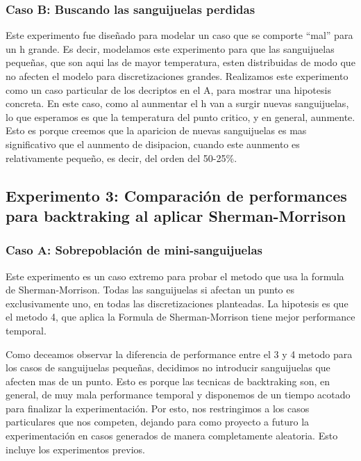 \subsubsection{Caso B: Buscando las sanguijuelas perdidas}

Este experimento fue dise\~nado para modelar un caso que se comporte ``mal'' para un 
h grande. Es decir, modelamos este experimento para que 
las sanguijuelas peque\~nas, que son aqui las de mayor temperatura, esten
distribuidas de modo que no afecten el
modelo para discretizaciones grandes. 
Realizamos este experimento como un caso particular de los decriptos en el A, para mostrar una 
hipotesis concreta. En este caso, como al aunmentar el h van a surgir nuevas sanguijuelas, lo
que esperamos es que la temperatura del punto critico, y en general, aunmente. Esto es porque creemos
que la aparicion de nuevas sanguijuelas es mas significativo que el aunmento de disipacion, cuando este
aunmento es relativamente peque\~no, es decir, del orden del 50-25\%.


\subsection{Experimento 3: Comparaci\'on de performances para backtraking al aplicar Sherman-Morrison}

\subsubsection{Caso A: Sobrepoblaci\'on de mini-sanguijuelas}

Este experimento es un caso extremo para probar el metodo que usa la 
formula de Sherman-Morrison. Todas las 
sanguijuelas si afectan un punto es exclusivamente uno,
en todas las discretizaciones planteadas. La hipotesis es que el metodo 4, que
aplica la Formula de Sherman-Morrison tiene mejor performance temporal.

Como deceamos observar la diferencia de performance entre el 3 y 4 metodo
para los casos de sanguijuelas peque\~nas, decidimos no introducir sanguijuelas que afecten mas de un punto.
Esto es porque las tecnicas de backtraking son, en general, de muy mala performance temporal y disponemos
de un tiempo acotado para finalizar la experimentaci\'on. Por esto, nos restringimos a los casos 
particulares que nos competen, dejando para como proyecto a futuro la experimentaci\'on en casos
generados de manera completamente aleatoria. Esto incluye los experimentos previos.

